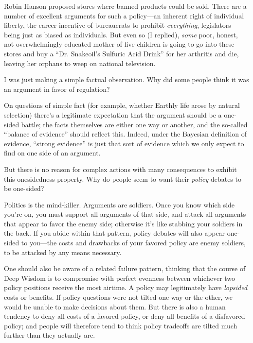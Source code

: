 {
 Robin Hanson proposed stores where banned products could be sold.
There are a number of excellent arguments for such a policy---an
inherent right of individual liberty, the career incentive of
bureaucrats to prohibit \textit{everything}, legislators being just as
biased as individuals. But even so (I replied), \textit{some} poor,
honest, not overwhelmingly educated mother of five children is going to
go into these stores and buy a ``Dr.
Snakeoil's Sulfuric Acid Drink'' for
her arthritis and die, leaving her orphans to weep on national
television. }

{
 I was just making a simple factual observation. Why did some
people think it was an argument in favor of regulation?}

{
 On questions of simple fact (for example, whether Earthly life
arose by natural selection) there's a legitimate
expectation that the argument should be a one-sided battle; the facts
themselves are either one way or another, and the so-called
``balance of evidence'' should
reflect this. Indeed, under the Bayesian definition of evidence,
``strong evidence'' is just that
sort of evidence which we only expect to find on one side of an
argument.}

{
 But there is no reason for complex actions with many consequences
to exhibit this onesidedness property. Why do people seem to want their
\textit{policy} debates to be one-sided?}

{
 Politics is the mind-killer. Arguments are soldiers. Once you know
which side you're on, you must support all arguments of
that side, and attack all arguments that appear to favor the enemy
side; otherwise it's like stabbing your soldiers in the
back. If you abide within that pattern, policy debates will also appear
one-sided to you---the costs and drawbacks of your favored policy are
enemy soldiers, to be attacked by any means necessary.}

{
 One should also be aware of a related failure pattern, thinking
that the course of Deep Wisdom is to compromise with perfect evenness
between whichever two policy positions receive the most airtime. A
policy may legitimately have \textit{lopsided} costs or benefits. If
policy questions were not tilted one way or the other, we would be
unable to make decisions about them. But there is also a human tendency
to deny all costs of a favored policy, or deny all benefits of a
disfavored policy; and people will therefore tend to think policy
tradeoffs are tilted much further than they actually are.}

